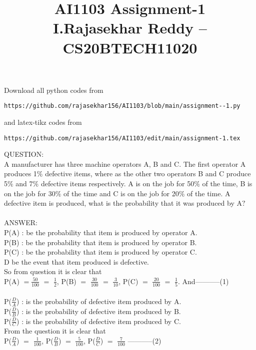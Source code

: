 \documentclass[]{article}
\title{}
\author{}
\begin{document}
\title{AI1103 Assignment-1 \\I.Rajasekhar Reddy -- CS20BTECH11020}
\maketitle
Download all python codes from 
\begin{lstlisting}
https://github.com/rajasekhar156/AI1103/blob/main/assignment--1.py
\end{lstlisting}
and latex-tikz codes from
\begin{lstlisting}
https://github.com/rajasekhar156/AI1103/edit/main/assignment-1.tex
\end{lstlisting}




QUESTION:\\
A manufacturer has three machine operators A, B and C. The first operator A produces 1$\%$ defective items, where as the other two operators B and C produce 5$\%$ and 7$\%$ defective items respectively. A is on the job
for 50$\%$ of the time, B is on the job for 30$\%$ of the time and C is on the job for 20$\%$ of the time. A defective item is produced, what
is the probability that it was produced by A$?$
\\ \\
ANSWER:\\
P(A) : be the probability that item is produced by operator A.\\
P(B) : be the probability that item is produced by operator B.\\
P(C) : be the probability that item is produced by operator C.\\
D be the event that item produced is defective.\\ 
So from question it is clear that\\
P(A) $= \frac{50}{100}$ $=$ $\frac{1}{2}$,  P(B) $=$ $\frac{30}{100}$ $=$ $\frac{3}{10}$,  P(C) $=$ $\frac{20}{100}$ $=$ $\frac{1}{5}$.
And-----------(1)\\ \\
P($\frac{D}{A}$) : is the probability of defective item produced by A.\\
P($\frac{D}{B}$) : is the probability of defective item produced by B.\\
P($\frac{D}{C}$) : is the probability of defective item produced by C.\\ 
From the question it is clear that\\
P($\frac{D}{A}$) $=$ $\frac{1}{100}$,  P($\frac{D}{B}$) $=$ $\frac{5}{100}$,  P($\frac{D}{C}$) $=$ $\frac{7}{100}$ -----------(2)\\ \\
\end{document}

